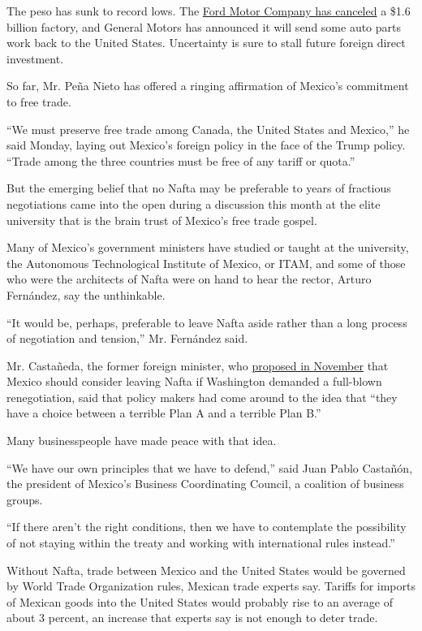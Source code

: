 The peso has sunk to record lows. The
\href{https://www.nytimes.com/2017/01/03/business/ford-general-motors-trump.html}{Ford
Motor Company has canceled} a \$1.6 billion factory, and General Motors
has announced it will send some auto parts work back to the United
States. Uncertainty is sure to stall future foreign direct investment.

So far, Mr. Peña Nieto has offered a ringing affirmation of Mexico's
commitment to free trade.

``We must preserve free trade among Canada, the United States and
Mexico,'' he said Monday, laying out Mexico's foreign policy in the face
of the Trump policy. ``Trade among the three countries must be free of
any tariff or quota.''

But the emerging belief that no Nafta may be preferable to years of
fractious negotiations came into the open during a discussion this month
at the elite university that is the brain trust of Mexico's free trade
gospel.

Many of Mexico's government ministers have studied or taught at the
university, the Autonomous Technological Institute of Mexico, or ITAM,
and some of those who were the architects of Nafta were on hand to hear
the rector, Arturo Fernández, say the unthinkable.

``It would be, perhaps, preferable to leave Nafta aside rather than a
long process of negotiation and tension,'' Mr. Fernández said.

Mr. Castañeda, the former foreign minister, who
\href{https://www.nytimes.com/2016/11/22/opinion/mexico-can-stand-up-to-trump.html}{proposed
in November} that Mexico should consider leaving Nafta if Washington
demanded a full-blown renegotiation, said that policy makers had come
around to the idea that ``they have a choice between a terrible Plan A
and a terrible Plan B.''

Many businesspeople have made peace with that idea.

``We have our own principles that we have to defend,'' said Juan Pablo
Castañón, the president of Mexico's Business Coordinating Council, a
coalition of business groups.

``If there aren't the right conditions, then we have to contemplate the
possibility of not staying within the treaty and working with
international rules instead.''

Without Nafta, trade between Mexico and the United States would be
governed by World Trade Organization rules, Mexican trade experts say.
Tariffs for imports of Mexican goods into the United States would
probably rise to an average of about 3 percent, an increase that experts
say is not enough to deter trade.

